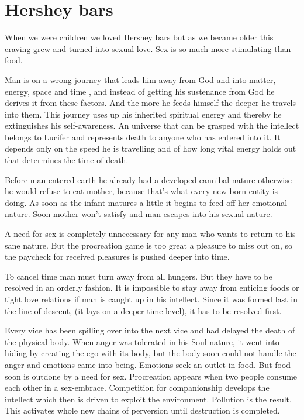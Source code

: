 \documentclass[12pt,letterpaper]{article}
\newcommand{\mest}{matter, energy, space and time }
\begin{document}
\section{Hershey bars}
\label{sec:hb}

When we were children we loved Hershey bars but as we became older
this craving grew and turned into sexual love. Sex is so much more
stimulating than food.

Man is on a wrong journey that leads him away from God and into \mest,
and instead of getting his sustenance from God he derives it from
these factors. And the more he feeds himself the deeper he travels
into them. This journey uses up his inherited spiritual energy and
thereby he extinguishes his self-awareness. An universe that can be
grasped with the intellect belongs to Lucifer and represents death to
anyone who has entered into it. It depends only on the speed he is
travelling and of how long vital energy holds out that determines the
time of death.

Before man entered earth he already had a developed cannibal nature
otherwise he would refuse to eat mother, because that's what every new
born entity is doing. As soon as the infant matures a little it begins
to feed off her emotional nature. Soon mother won't satisfy and man
escapes into his sexual nature.

A need for sex is completely unnecessary for any man who wants to
return to his sane nature. But the procreation game is too great a
pleasure to miss out on, so the paycheck for received pleasures is
pushed deeper into time.

To cancel time man must turn away from all hungers. But they have to
be resolved in an orderly fashion. It is impossible to stay away from
enticing foods or tight love relations if man is caught up in his
intellect. Since it was formed last in the line of descent, (it lays
on a deeper time level), it has to be resolved first.

Every vice has been spilling over into the next vice and had delayed
the death of the physical body. When anger was tolerated in his Soul
nature, it went into hiding by creating the ego with its body, but the
body soon could not handle the anger and emotions came into
being. Emotions seek an outlet in food. But food soon is outdone by a
need for sex. Procreation appears when two people consume each other
in a sex-embrace. Competition for companionship develops the intellect
which then is driven to exploit the environment. Pollution is the
result. This activates whole new chains of perversion until
destruction is completed.
\end{document}
